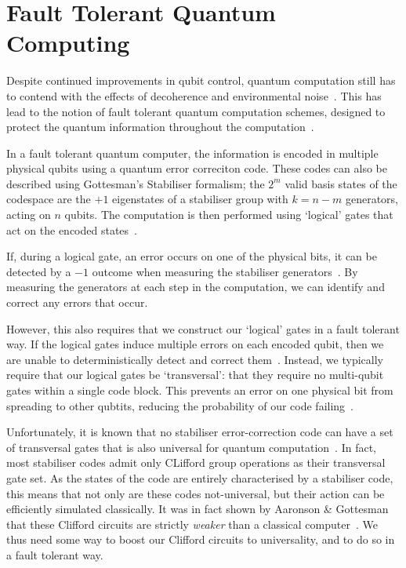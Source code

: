 \documentclass{standalone}
\begin{document}
\section{Fault Tolerant Quantum Computing}\label{sec:FTQC}
Despite continued improvements in qubit control, quantum computation still has to contend with the effects of decoherence and environmental noise~\cite{Nielsen2000}. This has lead to the notion of fault tolerant quantum computation schemes, designed to protect the quantum information throughout the computation~\cite{Nielsen2000}. 
\par
In a fault tolerant quantum computer, the information is encoded in multiple physical qubits using a quantum error correciton code. These codes can also be described using Gottesman's Stabiliser formalism; the $2^{m}$ valid basis states of the codespace are the $+1$ eigenstates of a stabiliser group with $k=n-m$ generators, acting on $n$ qubits. The computation is then performed using `logical' gates that act on the encoded states~\cite{Gottesman1997}.
\par
If, during a logical gate,  an error occurs on one of the physical bits, it can be detected by a $-1$ outcome when measuring the stabiliser generators~\cite{Gottesman1997}. By measuring the generators at each step in the computation, we can identify and correct any errors that occur.
\par
However, this also requires that we construct our `logical' gates in a fault tolerant way. If the logical gates induce multiple errors on each encoded qubit, then we are unable to deterministically detect and correct them~\cite{Gottesman2009}. Instead, we typically require that our logical gates be `transversal': that they require no multi-qubit gates within a single code block. This prevents an error on one physical bit from spreading to other qubtits, reducing the probability of our code failing~\cite{Nielsen2000,Gottesman2009}.
\par
Unfortunately, it is known that no stabiliser error-correction code can have a set of transversal gates that is also universal for quantum computation~\cite{Eastin2009}. In fact, most stabiliser codes admit only CLifford group operations as their transversal gate set. As the states of the code are entirely characterised by a stabiliser code, this means that not only are these codes not-universal, but their action can be efficiently simulated classically. It was in fact shown by Aaronson \& Gottesman that these Clifford circuits are strictly \emph{weaker} than a classical computer~\cite{Aaronson2004a}. We thus need some way to boost our Clifford circuits to universality, and to do so in a fault tolerant way. 
\end{document}
